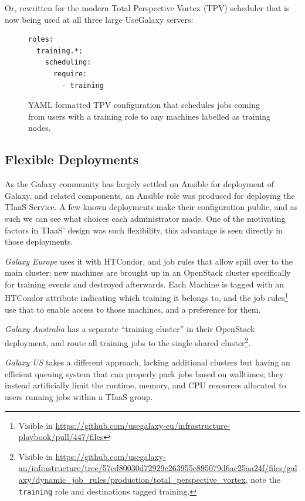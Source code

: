 Or, rewritten for the modern Total Perspective Vortex (TPV)\cite{TPV} scheduler that is now being used at all three large UseGalaxy servers:

\begin{figure}[!ht]
\centering
\begin{lstlisting}[frame=single,language=bash]
roles:
  training.*:
    scheduling:
      require:
        - training
\end{lstlisting}
\caption{YAML formatted TPV configuration that schedules jobs coming from users with a training role to any machines labelled as training nodes.\label{code:tpv}}
\end{figure}

\subsection*{Flexible Deployments}
As the Galaxy community has largely settled on Ansible for deployment of Galaxy, and related components, an Ansible role was produced for deploying the TIaaS Service. A few known deployments make their configuration public, and as such we can see what choices each administrator made. One of the motivating factors in TIaaS' design was such flexibility, this advantage is seen directly in those deployments.

\emph{Galaxy Europe} uses it with HTCondor, and job rules that allow spill over to the main cluster; new machines are brought up in an OpenStack cluster specifically for training events and destroyed afterwards. Each Machine is tagged with an HTCondor attribute indicating which training it belongs to, and the job rules\footnote{Visible in \url{https://github.com/usegalaxy-eu/infrastructure-playbook/pull/447/files}} use that to enable access to those machines, and a preference for them.

\emph{Galaxy Australia} has a separate ``training cluster'' in their OpenStack deployment, and route all training jobs to the single shared cluster\footnote{Visible in \url{https://github.com/usegalaxy-au/infrastructure/tree/57cd80030d72929c263955e895079d6ac25aa24f/files/galaxy/dynamic_job_rules/production/total_perspective_vortex}, note the \texttt{training} role and destinations tagged training.}.

\emph{Galaxy US} takes a different approach, lacking additional clusters but having an efficient queuing system that can properly pack jobs based on walltimes; they instead artificially limit the runtime, memory, and CPU resources allocated to users running jobs within a TIaaS group. 

